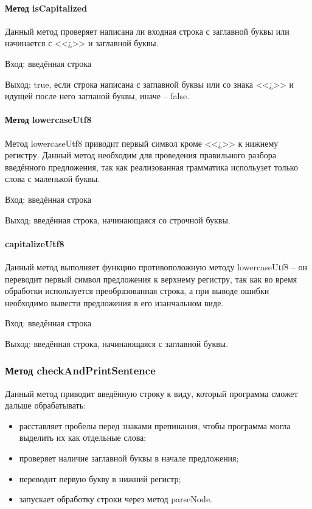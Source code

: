 \documentclass[a4paper,final]{article}
\begin{document}
\paragraph{Метод isCapitalized\\[1em]}
Данный метод проверяет написана ли входная строка с заглавной буквы или начинается с <<¿>> и заглавной буквы.

Вход: введённая строка

Выход: true, если строка написана с заглавной буквы или со знака <<¿>> и идущей после него загланой буквы, иначе -- false.

\paragraph{Метод lowercaseUtf8\\[1em]}
Метод lowercaseUtf8 приводит первый символ кроме <<¿>> к нижнему регистру. Данный метод необходим для проведения правильного разбора введённого предложения, так как реализованная грамматика испольузет только слова с маленькой буквы.

Вход: введённая строка

Выход: введённая строка, начинающаяся со строчной буквы.

\paragraph{capitalizeUtf8\\[1em]}

Данный метод выполняет функцию противоположную методу lowercaseUtf8 -- он переводит первый символ предложения к верхнему регистру, так как во время обработки используется преобразованная строка, а при выводе ошибки необходимо вывести предложения в его изанчальном виде.

Вход: введённая строка

Выход: введённая строка, начинающаяся с заглавной буквы.

\subsubsection{Метод checkAndPrintSentence}
Данный метод приводит введённую строку к виду, который программа сможет дальше обрабатывать:
\begin{itemize}
    \item расставляет пробелы перед знаками препинания, чтобы программа могла выделить их как отдельные слова;
    \item проверяет наличие заглавной буквы в начале предложения;
    \item переводит первую букву в нижний регистр;
    \item запускает обработку строки через метод parseNode.
\end{itemize}
\end{document}
